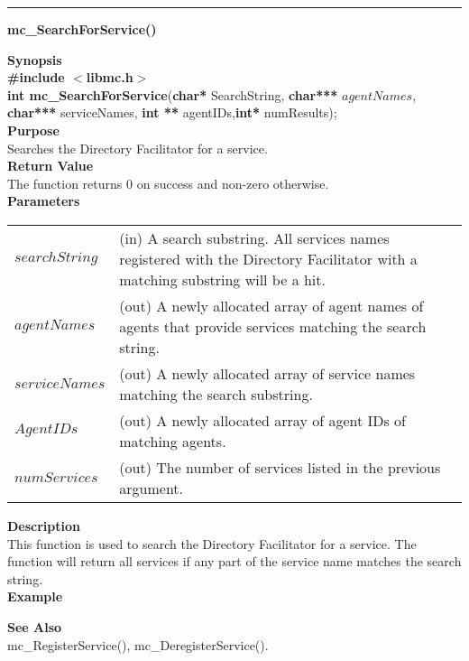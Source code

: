 \noindent
\vspace{5pt}
\rule{6.5in}{0.015in}
\noindent
{}
{\LARGE \bf mc\_SearchForService()}\\
\label{api:mc_SearchForService()}

\noindent
{\bf Synopsis}\\
{\bf \#include $<$libmc.h$>$}\\
{\bf int mc\_SearchForService}({\bf char*} SearchString,  {\bf char***} $agentNames$, {\bf char***} serviceNames, {\bf int **} agentIDs,{\bf int*} numResults);\\

\noindent
{\bf Purpose}\\
Searches the Directory Facilitator for a service.\\

\noindent
{\bf Return Value}\\
The function returns 0 on success and non-zero otherwise.\\

\noindent
{\bf Parameters}
\vspace{-0.1in}
\begin{description}
\item
\begin{tabular}{p{23 mm}p{145 mm}} 
$searchString$ & (in) A search substring. All services names registered with the Directory Facilitator with a matching substring will be a hit. \\
$agentNames$ & (out) A newly allocated array of agent names of agents that provide services matching the search string. \\
$serviceNames$ & (out) A newly allocated array of service names matching the search substring. \\
$AgentIDs$ & (out) A newly allocated array of agent IDs of matching agents. \\
$numServices$ & (out) The number of services listed in the previous argument.
\end{tabular}
\end{description}

\noindent
{\bf Description}\\
This function is used to search the Directory Facilitator for a service.
The function will return all services if any part of the service name 
matches the search string. \\

\noindent
{\bf Example}\\
\noindent
{\footnotesize}

\noindent
{\bf See Also}\\
mc\_RegisterService(), mc\_DeregisterService().

